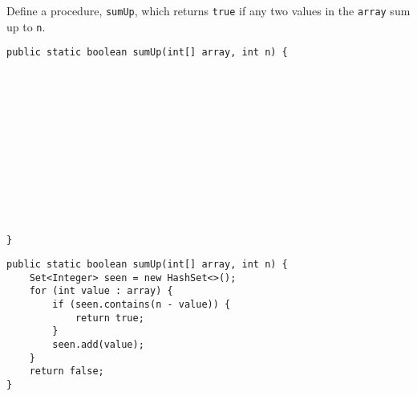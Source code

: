 \begin{blocksection}
\question Define a procedure, \lstinline$sumUp$, which returns \lstinline$true$
if any two values in the \lstinline$array$ sum up to \lstinline$n$.

\ifprintanswers\else
\begin{lstlisting}
public static boolean sumUp(int[] array, int n) {













}
\end{lstlisting}
\fi

\begin{solution}
\begin{lstlisting}
public static boolean sumUp(int[] array, int n) {
    Set<Integer> seen = new HashSet<>();
    for (int value : array) {
        if (seen.contains(n - value)) {
            return true;
        }
        seen.add(value);
    }
    return false;
}
\end{lstlisting}
\end{solution}
\end{blocksection}
